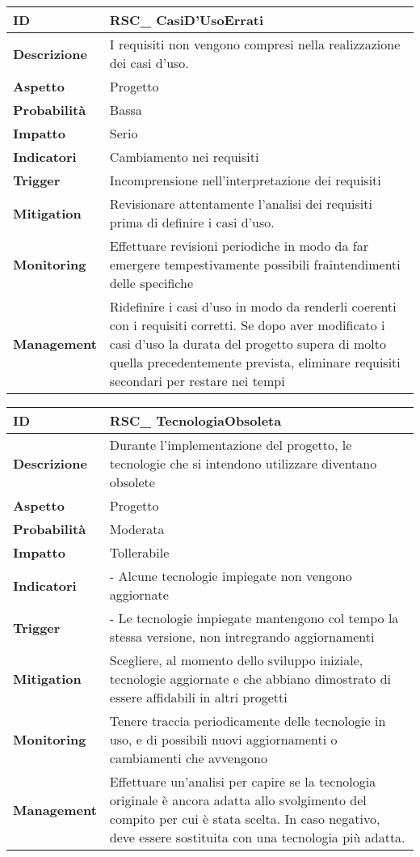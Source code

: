 \begin{tabular}{|p{2.2cm}|p{9.6cm}| }
 	\hline
	\textbf{ID} & RSC\_ CasiD'UsoErrati\\ [0.5ex] 
	\hline
	\textbf{Descrizione} & I requisiti non vengono compresi nella realizzazione dei casi d'uso.\\ 
	\hline
	\textbf{Aspetto} &  Progetto\\
	\hline
	\textbf{Probabilità} &  Bassa \\ 
	\hline
	\textbf{Impatto} &  Serio \\ 
	\hline
	\textbf{Indicatori} & Cambiamento nei requisiti\\
	\hline
	\textbf{Trigger} & Incomprensione nell'interpretazione dei requisiti\\
	\hline
	\textbf{Mitigation} & Revisionare attentamente l'analisi dei requisiti prima di definire i casi d'uso.\\ 
	\hline
	\textbf{Monitoring} & Effettuare revisioni periodiche in modo da far emergere tempestivamente possibili fraintendimenti delle specifiche\\ 
	\hline
	\textbf{Management} & Ridefinire i casi d'uso in modo da renderli coerenti con i requisiti corretti. Se dopo aver modificato i casi d'uso la durata del progetto supera di molto quella precedentemente prevista, eliminare requisiti secondari per restare nei tempi \\ 
	\hline
\end{tabular}
\clearpage
\begin{tabular}{|p{2.2cm}|p{9.6cm}| }
	\hline
   \textbf{ID} & RSC\_ TecnologiaObsoleta\\ [0.5ex] 
   \hline
   \textbf{Descrizione} & Durante l'implementazione del progetto, le tecnologie che si intendono utilizzare diventano obsolete \\ 
   \hline
   \textbf{Aspetto} &  Progetto \\
   \hline
   \textbf{Probabilità} & Moderata\\ 
   \hline
   \textbf{Impatto} & Tollerabile\\
	\hline
	\textbf{Indicatori} & - Alcune tecnologie impiegate non vengono aggiornate\\
	\hline
	\textbf{Trigger} & - Le tecnologie impiegate mantengono col tempo la stessa versione, non intregrando aggiornamenti\\
   \hline
   \textbf{Mitigation} & Scegliere, al momento dello sviluppo iniziale, tecnologie aggiornate e che abbiano dimostrato di essere affidabili in altri progetti \\ 
   \hline
   \textbf{Monitoring} & Tenere traccia periodicamente delle tecnologie in uso, e di possibili nuovi aggiornamenti o cambiamenti che avvengono \\ 
   \hline
   \textbf{Management} & Effettuare un’analisi per capire se la tecnologia originale è ancora adatta allo svolgimento del compito per cui è stata scelta. In caso negativo, deve essere sostituita con una tecnologia più adatta.\\ 
   \hline
\end{tabular}


